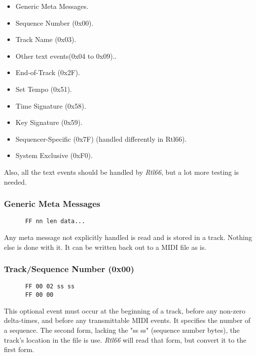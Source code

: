    \begin{itemize}
      \item Generic Meta Messages.
      \item Sequence Number (0x00).
      \item Track Name (0x03).
      \item Other text events(0x04 to 0x09)..
      \item End-of-Track (0x2F).
      \item Set Tempo (0x51).
      \item Time Signature (0x58).
      \item Key Signature (0x59).
      \item Sequencer-Specific (0x7F) (handled differently in Rtl66).
      \item System Exclusive (0xF0).
   \end{itemize}

   Also, all the text events should be handled by \textsl{Rtl66}, but
   a lot more testing is needed.

\subsubsection{Generic Meta Messages}
\label{subsubsec:midi_meta_generic}

   \begin{verbatim}
      FF nn len data...
   \end{verbatim}

   Any meta message not explicitly handled is read and is stored in a track.
   Nothing else is done with it.
   It can be written back out to a MIDI file as is.

\subsubsection{Track/Sequence Number (0x00)}
\label{subsubsec:midi_meta_sequence_number}

   \begin{verbatim}
      FF 00 02 ss ss
      FF 00 00
   \end{verbatim}

   This optional event must occur at the beginning of a track,
   before any non-zero delta-times, and before any transmittable MIDI
   events.  It specifies the number of a sequence. The second form,
   lacking the "ss ss" (sequence number bytes), the track's location in the
   file is use. \textsl{Rtl66} will read that form, but convert it to
   the first form.

